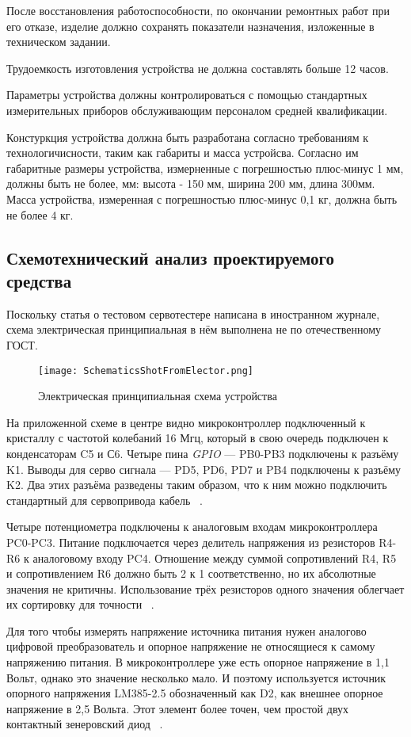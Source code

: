 После восстановления работоспособности,
по окончании ремонтных работ при его отказе, изделие
должно сохранять показатели назначения, изложенные в техническом задании.

Трудоемкость изготовления устройства не должна
составлять больше 12 часов.

Параметры устройства должны контролироваться с помощью стандартных
измерительных приборов обслуживающим персоналом средней квалификации.

Констуркция устройства должна быть разработана согласно требованиям к
технологичисности, таким как габариты и масса устройсва.
Согласно им габаритные размеры устройства, измерненные с погрешностью
плюс-минус 1 мм, должны быть не более, мм: высота - 150 мм, ширина 200
мм, длина 300мм. Масса устройства, измеренная с погрешностью плюс-минус 0,1 кг,
должна быть не более 4 кг.


\subsection{Схемотехнический анализ проектируемого средства}

Поскольку статья о тестовом сервотестере написана в иностранном журнале,
схема электрическая принципиальная в нём выполнена не по
отечественному ГОСТ.


\begin{figure}[H]
  \centering
  \texttt{[image: SchematicsShotFromElector.png]}
  \caption{Электрическая принципиальная схема устройства}
\end{figure}

На приложенной схеме в центре видно микроконтроллер подключенный к
кристаллу с частотой колебаний 16 Мгц, который в свою очередь
подключен к конденсаторам C5 и С6. Четыре пина \textit{GPIO} — PB0-PB3
подключены к разъёму K1. Выводы для серво сигнала — PD5, PD6, PD7 и
PB4 подключены к разъёму K2. Два этих разъёма разведены таким
образом, что к ним можно подключить стандартный для сервопривода
кабель ~\cite{Elector521}.

Четыре потенциометра подключены к аналоговым входам микроконтроллера
PC0-PC3. Питание подключается через делитель напряжения из резисторов
R4-R6 к аналоговому входу PC4. Отношение между суммой сопротивлений
R4, R5 и сопротивлением R6 должно быть 2 к 1 соответственно, но их
абсолютные значения не критичны. Использование трёх резисторов одного
значения облегчает их сортировку для точности ~\cite{Elector521}.

Для того чтобы измерять напряжение источника питания нужен аналогово
цифровой преобразователь и опорное напряжение не относящиеся к самому
напряжению питания.  В микроконтроллере уже есть опорное напряжение в
1,1 Вольт, однако это значение несколько мало. И поэтому используется
источник опорного напряжения LM385-2.5 обозначенный как D2, как
внешнее опорное напряжение в 2,5 Вольта. Этот элемент более точен, чем
простой двух контактный зенеровский диод ~\cite{Elector521}.

